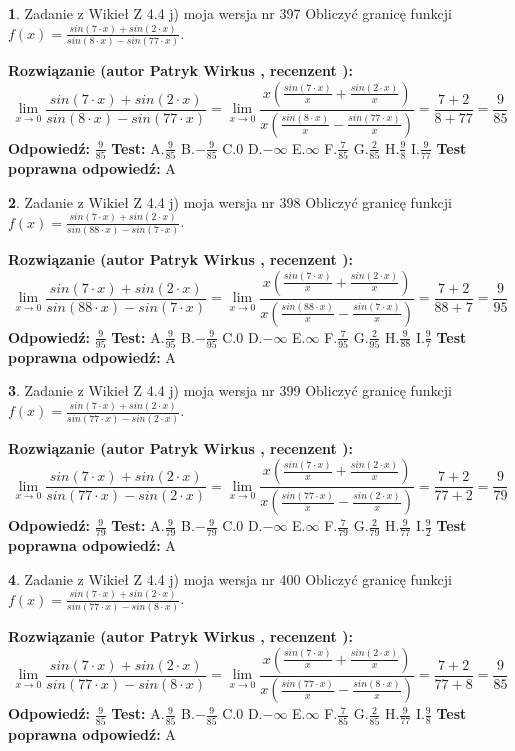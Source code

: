 \documentclass[12pt, a4paper]{article}
\theoremstyle{definition} %
\newtheorem{zad}{}
\newcommand{\zadStart}[1]{\begin{zad}#1\newline}
\newcommand{\zadStop}{\end{zad}}
\newcommand{\rozwStart}[2]{\noindent \textbf{Rozwiązanie (autor #1 , recenzent #2): }\newline}
\newcommand{\rozwStop}{\newline}
\newcommand{\odpStart}{\noindent \textbf{Odpowiedź:}\newline}
\newcommand{\odpStop}{\newline}
\newcommand{\testStart}{\noindent \textbf{Test:}\newline}
\newcommand{\testStop}{\newline}
\newcommand{\kluczStart}{\noindent \textbf{Test poprawna odpowiedź:}\newline}
\newcommand{\kluczStop}{\newline}
\begin{document}
\zadStart{Zadanie z Wikieł Z 4.4 j) moja wersja nr 397}
Obliczyć granicę funkcji $f(x)=\frac{sin(7\cdot x) +sin(2\cdot x)}{sin(8\cdot x) -sin(77\cdot x)}$.
\zadStop
\rozwStart{Patryk Wirkus}{}
$$\lim\limits_{x\to 0}\frac{sin(7\cdot x) +sin(2\cdot x)}{sin(8\cdot x) -sin(77\cdot x)}=\lim\limits_{x\to 0}\frac{x(\frac{sin(7\cdot x)}{x}+\frac{sin(2\cdot x)}{x})}{x(\frac{sin(8\cdot x)}{x}-\frac{sin(77\cdot x)}{x})}=\frac{7+2}{8+77} = \frac{9}{85}$$
\rozwStop
\odpStart
$\frac{9}{85}$
\odpStop
\testStart
A.$\frac{9}{85}$
B.$-\frac{9}{85}$
C.$0$
D.$-\infty$
E.$\infty$
F.$\frac{7}{85}$
G.$\frac{2}{85}$
H.$\frac{9}{8}$
I.$\frac{9}{77}$
\testStop
\kluczStart
A
\kluczStop



\zadStart{Zadanie z Wikieł Z 4.4 j) moja wersja nr 398}
Obliczyć granicę funkcji $f(x)=\frac{sin(7\cdot x) +sin(2\cdot x)}{sin(88\cdot x) -sin(7\cdot x)}$.
\zadStop
\rozwStart{Patryk Wirkus}{}
$$\lim\limits_{x\to 0}\frac{sin(7\cdot x) +sin(2\cdot x)}{sin(88\cdot x) -sin(7\cdot x)}=\lim\limits_{x\to 0}\frac{x(\frac{sin(7\cdot x)}{x}+\frac{sin(2\cdot x)}{x})}{x(\frac{sin(88\cdot x)}{x}-\frac{sin(7\cdot x)}{x})}=\frac{7+2}{88+7} = \frac{9}{95}$$
\rozwStop
\odpStart
$\frac{9}{95}$
\odpStop
\testStart
A.$\frac{9}{95}$
B.$-\frac{9}{95}$
C.$0$
D.$-\infty$
E.$\infty$
F.$\frac{7}{95}$
G.$\frac{2}{95}$
H.$\frac{9}{88}$
I.$\frac{9}{7}$
\testStop
\kluczStart
A
\kluczStop



\zadStart{Zadanie z Wikieł Z 4.4 j) moja wersja nr 399}
Obliczyć granicę funkcji $f(x)=\frac{sin(7\cdot x) +sin(2\cdot x)}{sin(77\cdot x) -sin(2\cdot x)}$.
\zadStop
\rozwStart{Patryk Wirkus}{}
$$\lim\limits_{x\to 0}\frac{sin(7\cdot x) +sin(2\cdot x)}{sin(77\cdot x) -sin(2\cdot x)}=\lim\limits_{x\to 0}\frac{x(\frac{sin(7\cdot x)}{x}+\frac{sin(2\cdot x)}{x})}{x(\frac{sin(77\cdot x)}{x}-\frac{sin(2\cdot x)}{x})}=\frac{7+2}{77+2} = \frac{9}{79}$$
\rozwStop
\odpStart
$\frac{9}{79}$
\odpStop
\testStart
A.$\frac{9}{79}$
B.$-\frac{9}{79}$
C.$0$
D.$-\infty$
E.$\infty$
F.$\frac{7}{79}$
G.$\frac{2}{79}$
H.$\frac{9}{77}$
I.$\frac{9}{2}$
\testStop
\kluczStart
A
\kluczStop



\zadStart{Zadanie z Wikieł Z 4.4 j) moja wersja nr 400}
Obliczyć granicę funkcji $f(x)=\frac{sin(7\cdot x) +sin(2\cdot x)}{sin(77\cdot x) -sin(8\cdot x)}$.
\zadStop
\rozwStart{Patryk Wirkus}{}
$$\lim\limits_{x\to 0}\frac{sin(7\cdot x) +sin(2\cdot x)}{sin(77\cdot x) -sin(8\cdot x)}=\lim\limits_{x\to 0}\frac{x(\frac{sin(7\cdot x)}{x}+\frac{sin(2\cdot x)}{x})}{x(\frac{sin(77\cdot x)}{x}-\frac{sin(8\cdot x)}{x})}=\frac{7+2}{77+8} = \frac{9}{85}$$
\rozwStop
\odpStart
$\frac{9}{85}$
\odpStop
\testStart
A.$\frac{9}{85}$
B.$-\frac{9}{85}$
C.$0$
D.$-\infty$
E.$\infty$
F.$\frac{7}{85}$
G.$\frac{2}{85}$
H.$\frac{9}{77}$
I.$\frac{9}{8}$
\testStop
\kluczStart
A
\kluczStop
\end{document}

